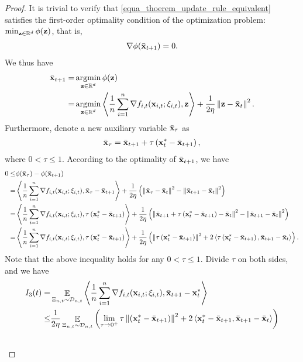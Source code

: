 \documentclass{article}
\begin{document}
\begin{proof}
It is trivial to verify that \eqref{equa_thoerem_update_rule_equivalent} satisfies the first-order optimality condition of the optimization problem: $\min_{{\bf z}\in\mathbb{R}^d} \phi({\bf z})$, that is,
\begin{align}
\nonumber
\nabla \phi(\bar{{\bf x}}_{t+1}) = 0.
\end{align} We thus have 
\begin{align}
\nonumber
\bar{\x}_{t+1} = & \argmin_{\z\in\RR^d} \phi(\z) \\ \nonumber
= & \argmin_{\z\in\RR^d} \lrangle{\frac{1}{n}\sum_{i=1}^n \nabla f_{i,t}(\x_{i,t};\xi_{i,t}), \z} + \frac{1}{2\eta}\lrnorm{\z - \bar{\x}_t}^2.
\end{align} Furthermore, denote a new auxiliary variable $\bar{{\bf x}}_{\tau}$ as  
\begin{align}
\nonumber
\bar{{\bf x}}_{\tau} = \bar{{\bf x}}_{t+1} + \tau \left( {\bf x}_t^\ast - \bar{{\bf x}}_{t+1} \right),
\end{align} where $0< \tau \le 1$. According to the optimality of $\bar{{\bf x}}_{t+1}$, we have
\begin{align}
\nonumber
0 \le & \phi(\bar{{\bf x}}_{\tau}) - \phi(\bar{{\bf x}}_{t+1}) \\ \nonumber
= & \left\langle\frac{1}{n}\sum_{i=1}^n \nabla f_{i,t}({\bf x}_{i,t};\xi_{i,t}), \bar{{\bf x}}_{\tau} - \bar{{\bf x}}_{t+1} \right\rangle + \frac{1}{2\eta}\left(  \left\lVert\bar{{\bf x}}_{\tau} - \bar{{\bf x}}_t\right\rVert^2 - \left\lVert\bar{{\bf x}}_{t+1} - \bar{{\bf x}}_t\right\rVert^2  \right) \\ \nonumber
= & \left\langle\frac{1}{n}\sum_{i=1}^n \nabla f_{i,t}({\bf x}_{i,t};\xi_{i,t}), \tau \left( {\bf x}_t^\ast - \bar{{\bf x}}_{t+1} \right) \right\rangle + \frac{1}{2\eta}\left(  \left\lVert\bar{{\bf x}}_{t+1} + \tau \left( {\bf x}_t^\ast - \bar{{\bf x}}_{t+1} \right) - \bar{{\bf x}}_t\right\rVert^2 - \left\lVert\bar{{\bf x}}_{t+1} - \bar{{\bf x}}_t\right\rVert^2  \right) \\ \nonumber
= & \left\langle\frac{1}{n}\sum_{i=1}^n \nabla f_{i,t}({\bf x}_{i,t};\xi_{i,t}), \tau \left( {\bf x}_t^\ast - \bar{{\bf x}}_{t+1} \right) \right\rangle + \frac{1}{2\eta}\left(  \left\lVert\tau \left( {\bf x}_t^\ast - \bar{{\bf x}}_{t+1} \right)\right\rVert^2 + 2\left\langle\tau \left( {\bf x}_t^\ast - \bar{{\bf x}}_{t+1} \right), \bar{{\bf x}}_{t+1} - \bar{{\bf x}}_t  \right\rangle  \right).
\end{align} Note that the above inequality holds for any $0< \tau \le 1$. Divide $\tau$ on both sides, and we have
\begin{align}
\nonumber
I_3(t) = & \EE_{ \Xi_{n,t} \sim \Dcal_{n,t} } \lrangle{\frac{1}{n}\sum_{i=1}^n \nabla f_{i,t}(\x_{i,t};\xi_{i,t}), \bar{\x}_{t+1} - \x_t^\ast} \\ \nonumber 
\le & \frac{1}{2\eta}\EE_{ \Xi_{n,t} \sim \Dcal_{n,t} }\lrincir{ \lim_{\tau \rightarrow 0^+}\tau \lrnorm{\lrincir{\x_t^\ast - \bar{\x}_{t+1}}}^2 + 2\lrangle{ \x_t^\ast - \bar{\x}_{t+1}, \bar{\x}_{t+1} - \bar{\x}_t } } \\ \nonumber

\end{align}
\end{proof}
\end{document}
